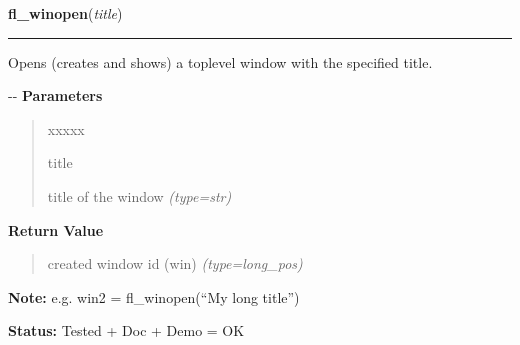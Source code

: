 \hspace{.8\funcindent}\begin{boxedminipage}{\funcwidth}

    \raggedright \textbf{fl\_winopen}(\textit{title})

    \vspace{-1.5ex}

    \rule{\textwidth}{0.5\fboxrule}
\setlength{\parskip}{2ex}

Opens (creates and shows) a toplevel window with the specified title.

-{}-
\setlength{\parskip}{1ex}
      \textbf{Parameters}
      \vspace{-1ex}

      \begin{quote}
        \begin{Ventry}{xxxxx}

          \item[title]


title of the window
            {\it (type=str)}

        \end{Ventry}

      \end{quote}

      \textbf{Return Value}
    \vspace{-1ex}

      \begin{quote}

created window id (win)
      {\it (type=long\_pos)}

      \end{quote}

\textbf{Note:} 
e.g. win2 = fl\_winopen(``My long title'')


\textbf{Status:} 
Tested + Doc + Demo = OK


    \end{boxedminipage}

    \label{xformslib:flxbasic:fl_winhide}

    \vspace{0.5ex}

